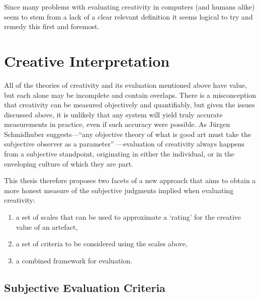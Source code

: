 Since many problems with evaluating creativity in computers (and humans alike) seem to stem from a lack of a clear relevant definition it seems logical to try and remedy this first and foremost.


\section{Creative Interpretation}

All of the theories of creativity and its evaluation mentioned above have value, but each alone may be incomplete and contain overlaps. There is a misconception that creativity can be measured objectively and quantifiably, but given the issues discussed above, it is unlikely that any system will yield truly accurate measurements in practice, even if such accuracy were possible. As J{\"u}rgen Schmidhuber suggests---``any objective theory of what is good art must take the subjective observer as a parameter'' \citeyear{Schmidhuber2006}---evaluation of creativity always happens from a subjective standpoint, originating in either the individual, or in the enveloping culture of which they are part.

This thesis therefore proposes two facets of a new approach that aims to obtain a more honest measure of the subjective judgments implied when evaluating creativity:

\begin{enumerate}
  \item a set of scales that can be used to approximate a `rating' for the creative value of an artefact,
  \item a set of criteria to be considered using the scales above,
  \item a combined framework for evaluation.
\end{enumerate}


\subsection{Subjective Evaluation Criteria}
\label{s:sec}

